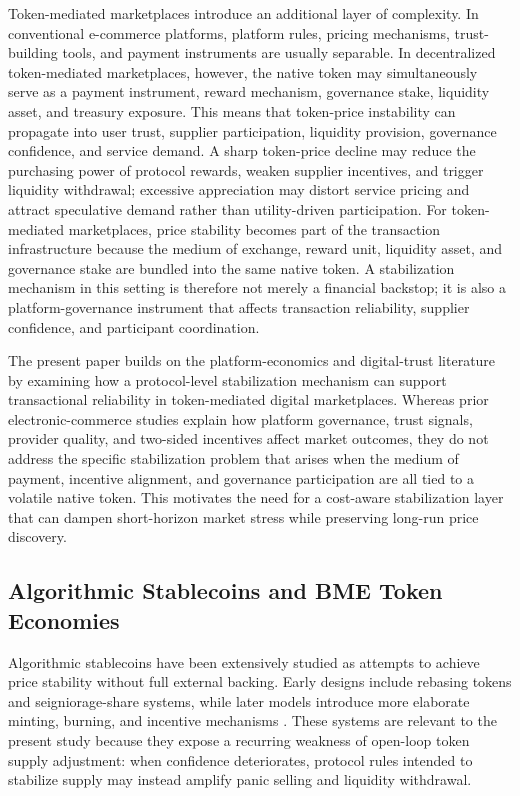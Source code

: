\documentclass[a4paper,fleqn]{cas-dc}
\begin{document}
Token-mediated marketplaces introduce an additional layer of complexity. In conventional e-commerce platforms, platform rules, pricing mechanisms, trust-building tools, and payment instruments are usually separable. In decentralized token-mediated marketplaces, however, the native token may simultaneously serve as a payment instrument, reward mechanism, governance stake, liquidity asset, and treasury exposure. This means that token-price instability can propagate into user trust, supplier participation, liquidity provision, governance confidence, and service demand. A sharp token-price decline may reduce the purchasing power of protocol rewards, weaken supplier incentives, and trigger liquidity withdrawal; excessive appreciation may distort service pricing and attract speculative demand rather than utility-driven participation. For token-mediated marketplaces, price stability becomes part of the transaction infrastructure because the medium of exchange, reward unit, liquidity asset, and governance stake are bundled into the same native token. A stabilization mechanism in this setting is therefore not merely a financial backstop; it is also a platform-governance instrument that affects transaction reliability, supplier confidence, and participant coordination.

The present paper builds on the platform-economics and digital-trust literature by examining how a protocol-level stabilization mechanism can support transactional reliability in token-mediated digital marketplaces. Whereas prior electronic-commerce studies explain how platform governance, trust signals, provider quality, and two-sided incentives affect market outcomes, they do not address the specific stabilization problem that arises when the medium of payment, incentive alignment, and governance participation are all tied to a volatile native token. This motivates the need for a cost-aware stabilization layer that can dampen short-horizon market stress while preserving long-run price discovery.

\subsection{Algorithmic Stablecoins and BME Token Economies}

Algorithmic stablecoins have been extensively studied as attempts to achieve price stability without full external backing. Early designs include rebasing tokens and seigniorage-share systems, while later models introduce more elaborate minting, burning, and incentive mechanisms \citep{wang2023rational,learning2025terra,castello2025digital,gregory2024break,svb2024machine,klages2020stablecoins}. These systems are relevant to the present study because they expose a recurring weakness of open-loop token supply adjustment: when confidence deteriorates, protocol rules intended to stabilize supply may instead amplify panic selling and liquidity withdrawal.
\end{document}
